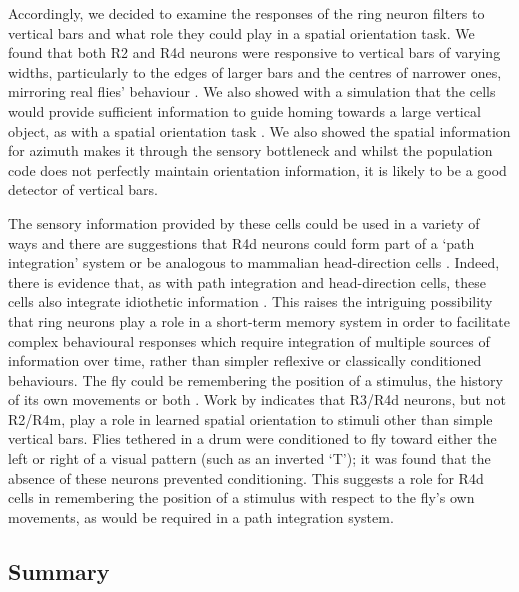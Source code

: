 \documentclass[10pt]{article}
\begin{document}
Accordingly, we decided to examine the responses of the ring neuron filters to vertical bars and what role they could play in a spatial orientation task.
We found that both R2 and R4d neurons were responsive to vertical bars of varying widths, particularly to the edges of larger bars and the centres of narrower ones, mirroring real flies' behaviour \cite{Osorio1990}.
We also showed with a simulation that the cells would provide sufficient information to guide homing towards a large vertical object, as with a spatial orientation task \cite{Neuser2008}.
We also showed the spatial information for azimuth makes it through the sensory bottleneck and whilst the population code does not perfectly maintain orientation information, it is likely to be a good detector of vertical bars.

The sensory information provided by these cells could be used in a variety of ways and there are suggestions that R4d neurons could form part of a `path integration' system \cite{Neuser2008} or be analogous to mammalian head-direction cells \cite{Tomchik2008}.
Indeed, there is evidence that, as with path integration and head-direction cells, these cells also integrate idiothetic information \cite{Zars2009}.
This raises the intriguing possibility that ring neurons play a role in a short-term memory system in order to facilitate complex behavioural responses which require integration of multiple sources of information over time, rather than simpler reflexive or classically conditioned behaviours. The fly could be remembering the position of a stimulus, the history of its own movements or both \cite{Tomchik2008}.
Work by \cite{Guo2015} indicates that R3/R4d neurons, but not R2/R4m, play a role in learned spatial orientation to stimuli other than simple vertical bars.
Flies tethered in a drum were conditioned to fly toward either the left or right of a visual pattern (such as an inverted `T'); it was found that the absence of these neurons prevented conditioning.
This suggests a role for R4d cells in remembering the position of a stimulus with respect to the fly's own movements, as would be required in a path integration system.

\subsection*{Summary}
\end{document}
